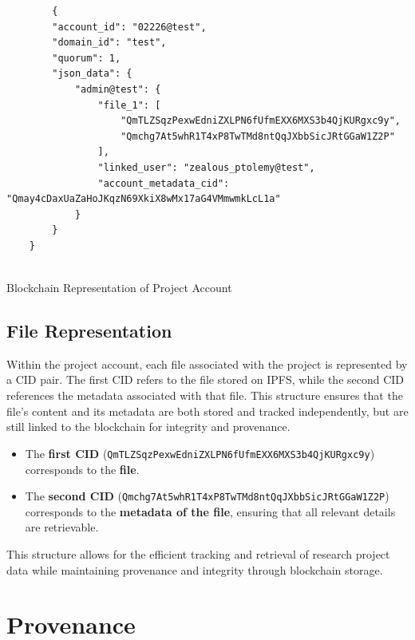 \documentclass[final]{rc-book-2.14}
\begin{document}
\begin{listing}
\begin{verbatim}
        {
        "account_id": "02226@test",
        "domain_id": "test",
        "quorum": 1,
        "json_data": {
            "admin@test": {
                "file_1": [
                    "QmTLZSqzPexwEdniZXLPN6fUfmEXX6MXS3b4QjKURgxc9y",
                    "Qmchg7At5whR1T4xP8TwTMd8ntQqJXbbSicJRtGGaW1Z2P"
                ],
                "linked_user": "zealous_ptolemy@test",
                "account_metadata_cid": "Qmay4cDaxUaZaHoJKqzN69XkiX8wMx17aG4VMmwmkLcL1a"
            }
        }
    }
  
\end{verbatim}
\caption{Blockchain Representation of Project Account}
\label{fig:project_blockchain_representation}
\end{listing}



\subsection{File Representation}

Within the project account, each file associated with the project is represented by a CID pair. The first CID refers to the file stored on IPFS, while the second CID references the metadata associated with that file. This structure ensures that the file's content and its metadata are both stored and tracked independently, but are still linked to the blockchain for integrity and provenance.

\begin{itemize}
    \item The \textbf{first CID} (\texttt{QmTLZSqzPexwEdniZXLPN6fUfmEXX6MXS3b4QjKURgxc9y}) corresponds to the \textbf{file}.
    \item The \textbf{second CID} (\texttt{Qmchg7At5whR1T4xP8TwTMd8ntQqJXbbSicJRtGGaW1Z2P}) corresponds to the \textbf{metadata of the file}, ensuring that all relevant details are retrievable.
\end{itemize}

This structure allows for the efficient tracking and retrieval of research project data while maintaining provenance and integrity through blockchain storage.

\section{Provenance}
\label{chp:proposed_model:sec:provenance}
\end{document}
